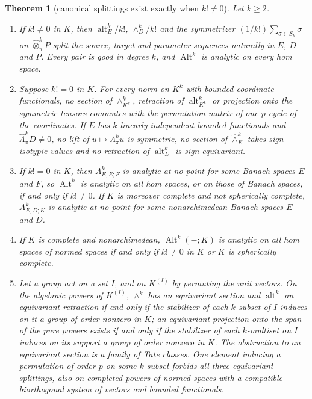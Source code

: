 \documentclass[11pt]{amsart}
\theoremstyle{definition}
\theoremstyle{remark}
\numberwithin{equation}{section}
\newcommand{\Alt}{\operatorname{Alt}}
\theoremstyle{plain}
\newtheorem{introtheorem}{Theorem}
\theoremstyle{definition}
\theoremstyle{plain}
\newcommand{\alt}{\operatorname{alt}}
\begin{document}
\begin{introtheorem}[canonical splittings exist exactly when $k!\ne0$]\label{intro:thm:B}
Let $k\ge2$.
\begin{enumerate}
\item If $k!\ne0$ in $K$, then $\alt^k_E/k!$, $\wedge^k_D/k!$ and the symmetrizer $(1/k!)\sum_{\sigma\in S_k}\sigma$ on
$\widehat\otimes^k_\pi P$ split the source, target and parameter sequences naturally in $E$, $D$ and $P$. Every pair is
good in degree $k$, and $\Alt^k$ is analytic on every hom space.
\item Suppose $k!=0$ in $K$. For every norm on $K^k$ with bounded coordinate functionals, no section of
$\wedge^k_{K^k}$, retraction of $\alt^k_{K^k}$ or projection onto the symmetric tensors commutes with the permutation
matrix of one $p$-cycle of the coordinates. If $E$ has $k$ linearly independent bounded functionals and
$\widehat\Lambda^k_\pi D\ne0$, no lift of $u\mapsto\Lambda^k_\pi u$ is symmetric, no section of $\widehat\wedge^k_E$
takes sign-isotypic values and no retraction of $\alt^k_D$ is sign-equivariant.
\item If $k!=0$ in $K$, then $A^k_{E,E;F}$ is analytic at no point for some Banach spaces $E$ and $F$, so $\Alt^k$ is
analytic on all hom spaces, or on those of Banach spaces, if and only if $k!\ne0$. If $K$ is moreover complete and not
spherically complete, $A^k_{E,D;K}$ is analytic at no point for some nonarchimedean Banach spaces $E$ and $D$.
\item If $K$ is complete and nonarchimedean, $\Alt^k(-;K)$ is analytic on all hom spaces of normed spaces if and only
if $k!\ne0$ in $K$ or $K$ is spherically complete.
\item Let a group act on a set $I$, and on $K^{(I)}$ by permuting the unit vectors. On the algebraic powers of
$K^{(I)}$, $\wedge^k$ has an equivariant section and $\alt^k$ an equivariant retraction if and only if the stabilizer of
each $k$-subset of $I$ induces on it a group of order nonzero in $K$; an equivariant projection onto the span of the
pure powers exists if and only if the stabilizer of each $k$-multiset on $I$ induces on its support a group of order
nonzero in $K$. The obstruction to an equivariant section is a family of Tate classes. One element inducing a
permutation of order $p$ on some $k$-subset forbids all three equivariant splittings, also on completed powers of normed
spaces with a compatible biorthogonal system of vectors and bounded functionals.
\end{enumerate}
\end{introtheorem}
\end{document}
